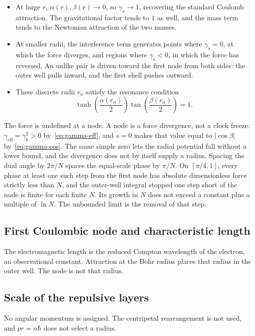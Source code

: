 \documentclass[a4paper]{article}
\begin{document}
\begin{itemize}
  \item At large \(r\), \(\alpha(r),\beta(r) \to 0\), so \(\gamma_s \to 1\), recovering the standard Coulomb attraction. The gravitational factor tends to \(1\) as well, and the mass term tends to the Newtonian attraction of the two masses.
  \item At smaller radii, the interference term generates points where \(\gamma_s = 0\), at which the force diverges, and regions where \(\gamma_s < 0\), in which the force has reversed. An unlike pair is driven toward the first node from both sides: the outer well pulls inward, and the first shell pushes outward.
  \item These discrete radii \(r_n\) satisfy the resonance condition
  \[
  \tanh\!\left(\frac{\alpha(r_n)}{2}\right) \tan\!\left(\frac{\beta(r_n)}{2}\right) = 1.
  \]
\end{itemize}

The force is undefined at a node. A node is a force divergence, not a clock freeze: \(\gamma_{\mathrm{eff}}=\gamma_b^2>0\) by~\eqref{eq:gamma-eff}, and \(s=0\) makes that value equal to \(|\cos\beta|\) by~\eqref{eq:gamma-cos}. The same simple zero lets the radial potential fall without a lower bound, and the divergence does not by itself supply a radius. Spacing the dual angle by \(2\pi/N\) spaces the equal-scale phase by \(\pi/N\). On \([\pi/4,1]\), every phase at least one such step from the first node has absolute dimensionless force strictly less than \(N\), and the outer-well integral stopped one step short of the node is finite for each finite \(N\). Its growth in \(N\) does not exceed a constant plus a multiple of \(\ln N\). The unbounded limit is the removal of that step.

\subsection{First Coulombic node and characteristic length}

The electromagnetic length is the reduced Compton wavelength of the electron, an observational constant. Attraction at the Bohr radius places that radius in the outer well. The node is not that radius.

\subsection{Scale of the repulsive layers}

No angular momentum is assigned. The centripetal rearrangement is not used, and \(pr=n\hbar\) does not select a radius.
\end{document}
